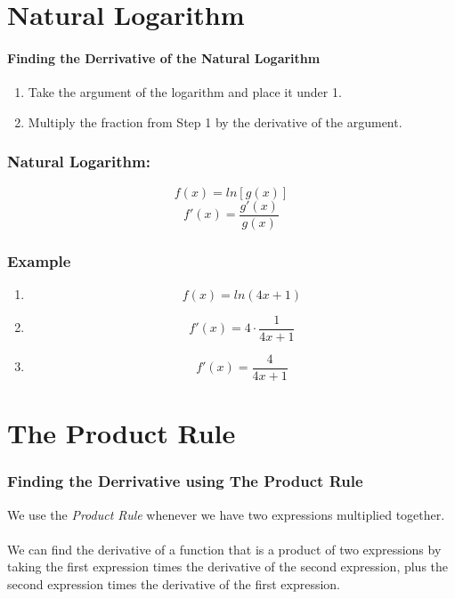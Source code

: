 \documentclass[a4paper,11pt]{book}
\begin{document}
\section{Natural Logarithm}
\paragraph{Finding the Derrivative of the Natural Logarithm}
\normalsize 
\begin{enumerate}
  \item Take the argument of the logarithm and place it under 1.
  \item Multiply the fraction from Step 1 by the derivative of the argument.
\end{enumerate}

\subsubsection{Natural Logarithm:}
\LARGE 
\[ f(x) = ln[g(x)] \]
\[ f'(x) = \frac{g'(x)}{g(x)} \]

\subsubsection{Example}
\LARGE 
\begin{enumerate}
  \item \[ f(x) = ln(4x + 1) \]
  \item \[ f'(x) = 4\cdot \frac{1}{4x + 1} \]
  \item \[ f'(x) = \frac{4}{4x + 1} \]
\end{enumerate}
\normalsize 










\section{The Product Rule}
\subsubsection{Finding the Derrivative using The Product Rule}
\normalsize 
We use the \textit{Product Rule} whenever we have two expressions multiplied together.
\\
\\

We can find the derivative of a function that is a product of two expressions by taking the first expression times the derivative of the second expression, plus the second expression times the derivative of the first expression.
\end{document}

